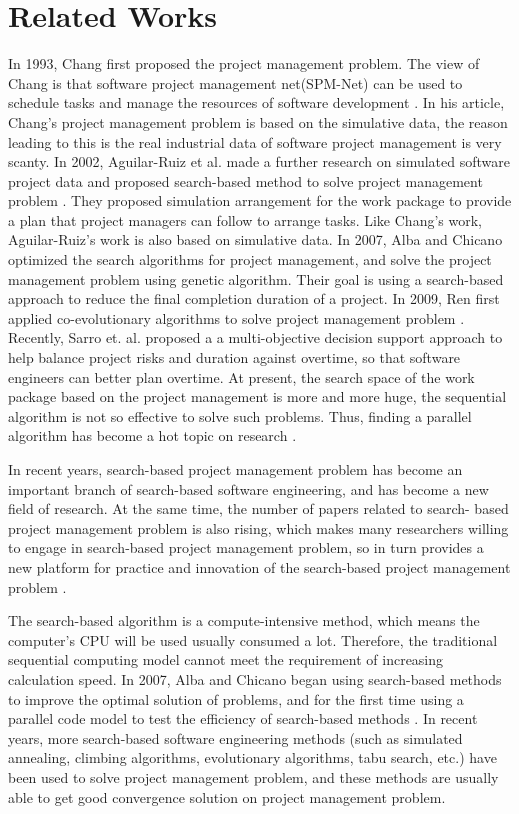 
\section{Related Works}
%
In 1993, Chang first proposed the project management problem. The view of 
Chang is that software project management net(SPM-Net) can be used to 
schedule tasks and manage the resources of software development \cite{chang}. 
In his article, Chang's project management problem is based on the simulative 
data, the reason leading to this is the real industrial data of software 
project management is very scanty. In 2002, Aguilar-Ruiz et al. made a 
further research on simulated software project data and proposed search-based 
method to solve project management problem \cite{alba}. They proposed 
simulation arrangement for the work package to provide a plan that project 
managers can follow to arrange tasks. Like Chang’s work, Aguilar-Ruiz's work 
is also based on simulative data. In 2007, Alba and Chicano optimized the 
search algorithms for project management, and solve the project management 
problem using genetic algorithm. Their goal is using a search-based approach 
to reduce the final completion duration of a project. In 2009, Ren first 
applied co-evolutionary algorithms to solve project management problem 
\cite{ren}. Recently, Sarro et. al. \cite{sarro}proposed a a multi-objective decision support approach to help
balance project risks and duration against overtime, so that software
engineers can better plan overtime. 
At present, the search space of the work package based on the project 
management is more and more huge, the sequential algorithm is not so 
effective to solve such problems. Thus, finding a parallel algorithm has 
become a hot topic on research \cite{pentico}.


In recent years, search-based project management problem has become an 
important branch of search-based software engineering, and has become a new 
field of research. At the same time, the number of papers related to search-
based project management problem is also rising, which makes many researchers 
willing to engage in search-based project management problem, so in turn 
provides a new platform for practice and innovation of the search-based 
project management problem \cite{penta}.


The search-based algorithm is a compute-intensive method, which means the
computer's CPU will be used usually consumed a lot. Therefore, the traditional
sequential computing model cannot meet the requirement of increasing calculation
speed. In 2007, Alba and Chicano began using search-based methods to improve the
optimal solution of problems, and for the first time using a parallel code model
to test the efficiency of search-based methods \cite{pospichal}. In recent
years, more search-based software engineering methods (such as simulated
annealing, climbing algorithms, evolutionary algorithms, tabu search, etc.) have
been used to solve project management problem, and these methods are usually
able to get good convergence solution on project management problem.

